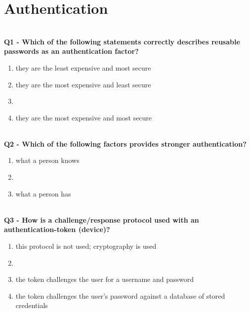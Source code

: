 \section{Authentication}
\textbf{\\Q1 - Which of the following statements correctly describes reusable passwords as an authentication factor?}
\begin{enumerate}
	\item[A.] they are the least expensive and most secure
	\item[B.] they are the most expensive and least secure
	\item[C.] 
	\item[D.] they are the most expensive and most secure
\end{enumerate}

\textbf{\\Q2 - Which of the following factors provides stronger authentication?}
\begin{enumerate}
	\item[A.] what a person knows
	\item[B.] 
	\item[C.] what a person has
\end{enumerate}

\textbf{\\Q3 - How is a challenge/response protocol used with an authentication-token (device)?}
\begin{enumerate}
	\item[A.] this protocol is not used; cryptography is used
	\item[B.] 
	\item[C.] the token challenges the user for a username and password
	\item[D.] the token challenges the user’s password against a database of stored credentials
\end{enumerate}

